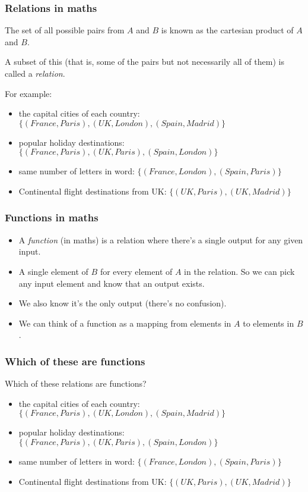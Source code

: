 \documentclass{beamer}
\begin{document}
\begin{frame}[fragile]
\frametitle{Relations in maths}
The set of all possible pairs from $A$ and $B$ is known as the cartesian product of $A$
and $B$.

A subset of this (that is, some of the pairs but not necessarily all
of them) is called a {\em relation}.

For example: 
\begin{itemize} 
\item the capital cities of each country: $\{(France, Paris), (UK,
  London), (Spain, Madrid) \}$
\item popular holiday destinations: $\{ (France, Paris), (UK, Paris),
  (Spain, London) \}$
\item same number of letters in word: $\{ (France, London), (Spain,
  Paris) \}$
\item Continental flight destinations from UK: $\{ (UK, Paris), (UK, Madrid) \}$
\end{itemize}

\end{frame}

\begin{frame}[fragile]
\frametitle{Functions in maths}
\begin{itemize}
\item A {\em function} (in maths) is a relation where there's a single output for
any given input. \\
\item A single element of $B$ for every element of $A$ in the relation.
So we can pick any input element and know that an output
exists. \\
\item We also know it's the only output (there's no confusion). \\
\item We can think of a function as a mapping from elements in $A$
to elements in $B$.
\end{itemize}
\end{frame}


\begin{frame}[fragile]
\frametitle{Which of these are functions}

Which of these relations are functions?
 
\begin{itemize} 
\item the capital cities of each country: $\{(France, Paris), (UK,
  London), (Spain, Madrid) \}$
\item popular holiday destinations: $\{ (France, Paris), (UK, Paris),
  (Spain, London) \}$
\item same number of letters in word: $\{ (France, London), (Spain,
  Paris) \}$
\item Continental flight destinations from UK: $\{ (UK, Paris), (UK, Madrid) \}$
\end{itemize}
\end{frame}
\end{document}
